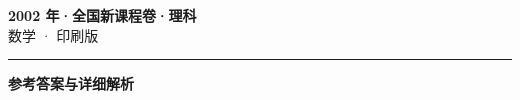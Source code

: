 \documentclass[zihao=5, a4paper]{ctexart}
\begin{document}
\begin{center}
  {\Large\bfseries 2002 年·全国新课程卷·理科}\\[4pt]
  {\large 数学 · 印刷版}
\end{center}
\medskip
{}

\par\bigskip\hrule\bigskip
{}
\begin{center}{\large\bfseries 参考答案与详细解析}\end{center}
\smallskip

\end{document}

